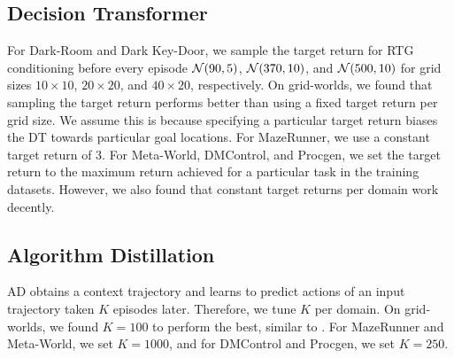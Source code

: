 \documentclass{article}
\begin{document}
\subsection{Decision Transformer}\label{appendix:dt}
For Dark-Room and Dark Key-Door, we sample the target return for RTG conditioning before every episode $\mathcal{N}(90,5)$, $\mathcal{N}(370,10)$, and $\mathcal{N}(500,10)$ for grid sizes $10\times10$,  $20\times20$, and $40\times20$, respectively.
On grid-worlds, we found that sampling the target return performs better than using a fixed target return per grid size.
We assume this is because specifying a particular target return biases the DT towards particular goal locations.
For MazeRunner, we use a constant target return of 3.
For Meta-World, DMControl, and Procgen, we set the target return to the maximum return achieved for a particular task in the training datasets.
However, we also found that constant target returns per domain work decently.
\subsection{Algorithm Distillation}
AD obtains a context trajectory and learns to predict actions of an input trajectory taken $K$ episodes later.
Therefore, we tune $K$ per domain.
On grid-worlds, we found $K=100$ to perform the best, similar to \citet{Lee:23}.
For MazeRunner and Meta-World, we set $K=1000$, and for DMControl and Procgen, we set $K=250$.
\end{document}
